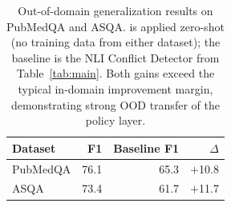\begin{table}[t]
\centering
\small
\begin{tabular}{lrrr}
\toprule
Dataset & \method{} F1 & Baseline F1 & $\Delta$ \\
\midrule
PubMedQA & 76.1 & 65.3 & $+$10.8 \\
ASQA     & 73.4 & 61.7 & $+$11.7 \\
\bottomrule
\end{tabular}
\caption{Out-of-domain generalization results on PubMedQA and ASQA. \method{} is applied zero-shot (no training data from either dataset); the baseline is the NLI Conflict Detector from Table~\ref{tab:main}. Both gains exceed the typical in-domain improvement margin, demonstrating strong OOD transfer of the \method{} policy layer.}
\label{tab:ood-transfer}
\end{table}
